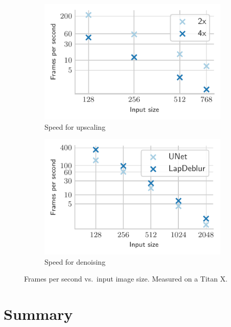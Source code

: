 \documentclass{scrartcl}
\begin{document}
\begin{figure}[htb]
\centering
\begin{subfigure}{0.45\textwidth}
\centering
    \includegraphics[]{time_upscaling_paper}
    \caption{Speed for upscaling}
\end{subfigure}\quad\qquad%
\begin{subfigure}{0.45\textwidth}
\centering
    \includegraphics{time_denoising_paper}
    \caption{Speed for denoising}
\end{subfigure}
\caption{Frames per second vs.\ input image size.
Measured on a Titan X.}
\label{fig:benchmark}
\end{figure}

\section{Summary}
\end{document}
